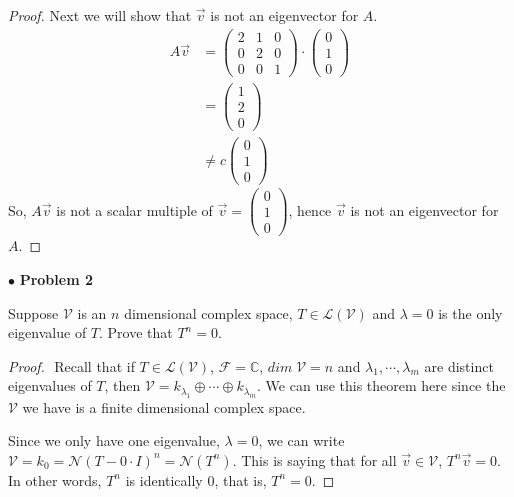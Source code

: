 \documentclass{article}
\begin{document}
\begin{proof}
Next we will show that $\vec{v}$ is not an eigenvector for $A$.
\begin{align*}
A\vec{v} &= \begin{pmatrix} 2& 1 & 0 \\ 0&2&0 \\ 0&0&1 \end{pmatrix} \cdot \begin{pmatrix} 0\\1\\0 \end{pmatrix} \\
&= \begin{pmatrix}1 \\2\\0 \end{pmatrix} \\
&\ne c \begin{pmatrix}0\\1\\0 \end{pmatrix}
\end{align*}
So, $A\vec{v}$ is not a scalar multiple of $\vec{v} = \begin{pmatrix}0\\1\\0 \end{pmatrix}$, hence $\vec{v}$ is not an eigenvector for $A$.
\end{proof}

\newpage
$ \bullet$ \textbf{Problem 2}
\medskip

\begin{itshape}
Suppose $\mathcal{V}$ is an $n$ dimensional complex space, $T \in \mathcal{L}(\mathcal{V})$ and $\lambda=0$ is the only eigenvalue of $T$. Prove that $T^n=0$.
\end{itshape}
\medskip

\begin{proof}
$ $\newline
Recall that if $T \in \mathcal{L}(\mathcal{V})$, $\mathcal{F} = \mathbb{C}$, $dim \; \mathcal{V} = n$ and $\lambda_1, \cdots , \lambda_m$ are distinct eigenvalues of $T$, then $\mathcal{V} = k_{\lambda_1} \oplus \cdots \oplus k_{\lambda_m}$. We can use this theorem here since the $\mathcal{V}$ we have is a finite dimensional complex space.

Since we only have one eigenvalue, $\lambda =0$, we can write $\mathcal{V} = k_0 = \mathcal{N}(T- 0 \cdot I)^n = \mathcal{N}(T^n)$. This is saying that for all $\vec{v} \in \mathcal{V}$, $T^n \vec{v} =0$. In other words, $T^n$ is identically 0, that is, $T^n=0$.
\end{proof}
\end{document}
